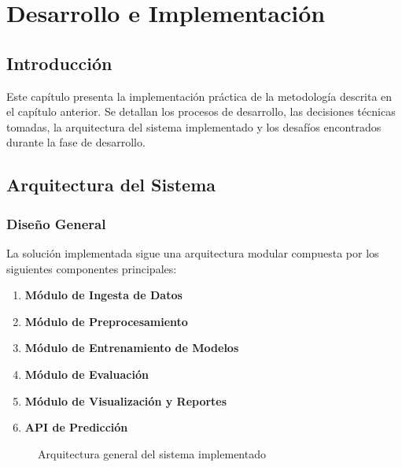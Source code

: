 
\chapter{Desarrollo e Implementación}

\section{Introducción}

Este capítulo presenta la implementación práctica de la metodología descrita en el capítulo anterior. Se detallan los procesos de desarrollo, las decisiones técnicas tomadas, la arquitectura del sistema implementado y los desafíos encontrados durante la fase de desarrollo.

\section{Arquitectura del Sistema}

\subsection{Diseño General}

La solución implementada sigue una arquitectura modular compuesta por los siguientes componentes principales:

\begin{enumerate}
    \item \textbf{Módulo de Ingesta de Datos}
    \item \textbf{Módulo de Preprocesamiento}
    \item \textbf{Módulo de Entrenamiento de Modelos}
    \item \textbf{Módulo de Evaluación}
    \item \textbf{Módulo de Visualización y Reportes}
    \item \textbf{API de Predicción}
\end{enumerate}

\begin{figure}[htbp]
\centering
\caption{Arquitectura general del sistema implementado}
\label{fig:arquitectura_sistema}
\end{figure}

